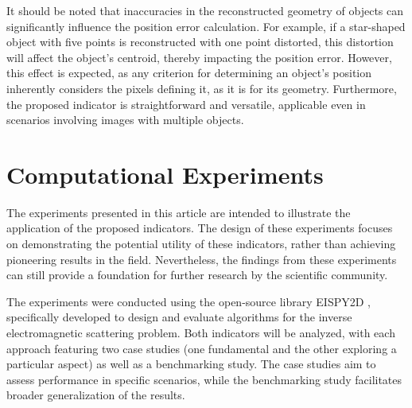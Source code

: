 \documentclass{IEEEtran}
\begin{document}
            It should be noted that inaccuracies in the reconstructed geometry of objects can significantly influence the position error calculation. For example, if a star-shaped object with five points is reconstructed with one point distorted, this distortion will affect the object's centroid, thereby impacting the position error. However, this effect is expected, as any criterion for determining an object's position inherently considers the pixels defining it, as it is for its geometry. Furthermore, the proposed indicator is straightforward and versatile, applicable even in scenarios involving images with multiple objects.
	
	\section{Computational Experiments}\label{sec:results}
	

        The experiments presented in this article are intended to illustrate the application of the proposed indicators. The design of these experiments focuses on demonstrating the potential utility of these indicators, rather than achieving pioneering results in the field. Nevertheless, the findings from these experiments can still provide a foundation for further research by the scientific community.


        The experiments were conducted using the open-source library EISPY2D \cite{batista2022eispy2d}, specifically developed to design and evaluate algorithms for the inverse electromagnetic scattering problem. Both indicators will be analyzed, with each approach featuring two case studies (one fundamental and the other exploring a particular aspect) as well as a benchmarking study. The case studies aim to assess performance in specific scenarios, while the benchmarking study facilitates broader generalization of the results.
\end{document}
